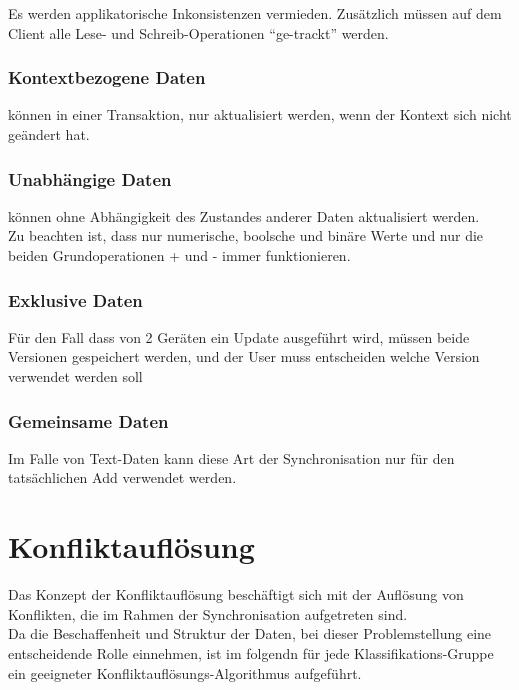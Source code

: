 \documentclass[oneside,11pt,parskip=half,ngerman]{scrreprt}
\begin{document}
Es werden applikatorische Inkonsistenzen vermieden. Zusätzlich müssen
auf dem Client alle Lese- und Schreib-Operationen \enquote{ge-trackt}
werden.

\subsubsection{Kontextbezogene Daten}\label{kontextbezogene-daten-1}

können in einer Transaktion, nur aktualisiert werden, wenn der Kontext
sich nicht geändert hat.

\subsubsection{Unabhängige Daten}\label{unabhuxe4ngige-daten-1}

können ohne Abhängigkeit des Zustandes anderer Daten aktualisiert
werden.\\Zu beachten ist, dass nur numerische, boolsche und binäre Werte
und nur die beiden Grundoperationen + und - immer funktionieren.

\subsubsection{Exklusive Daten}\label{exklusive-daten-1}

Für den Fall dass von 2 Geräten ein Update ausgeführt wird, müssen beide
Versionen gespeichert werden, und der User muss entscheiden welche
Version verwendet werden soll

\subsubsection{Gemeinsame Daten}\label{gemeinsame-daten-1}

Im Falle von Text-Daten kann diese Art der Synchronisation nur für den
tatsächlichen Add verwendet werden.

\newpage

\section{Konfliktauflösung}\label{konfliktaufluxf6sung}

Das Konzept der Konfliktauflösung beschäftigt sich mit der Auflösung von
Konflikten, die im Rahmen der Synchronisation aufgetreten sind.\\Da die
Beschaffenheit und Struktur der Daten, bei dieser Problemstellung eine
entscheidende Rolle einnehmen, ist im folgendn für jede
Klassifikations-Gruppe ein geeigneter Konfliktauflösungs-Algorithmus
aufgeführt.
\end{document}
